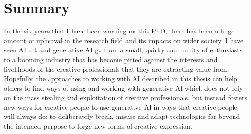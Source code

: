 \section{Summary}

In the six years that I have been working on this PhD, there has been a huge amount of upheaval in the research field and its impacts on wider society. 
I have seen AI art and generative AI go from a small, quirky community of enthusiasts to a booming industry that has become pitted against the interests and livelihoods of the creative professionals that they are extracting value from.
Hopefully, the approaches to working with AI described in this thesis can help others to find ways of using and working with generative AI which does not rely on the mass stealing and exploitation of creative professionals, but instead fosters new ways for creative people to use generative AI in ways that creative people will always do: to deliberately break, misuse and adapt technologies far beyond the intended purpose to forge new forms of creative expression.
